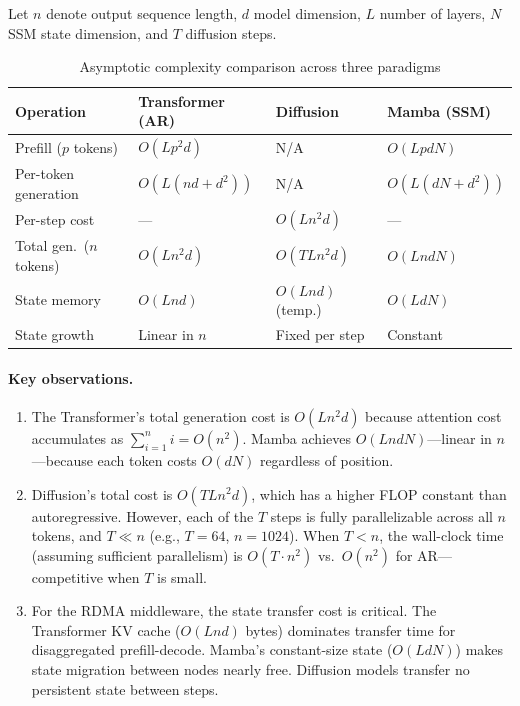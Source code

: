 \documentclass[11pt,letterpaper]{article}
\begin{document}
Let $n$ denote output sequence length, $d$ model dimension, $L$ number of layers, $N$ SSM state dimension, and $T$ diffusion steps.

\begin{table}[htbp]
\centering
\caption{Asymptotic complexity comparison across three paradigms}
\label{tab:complexity}
\begin{tabular}{@{}llll@{}}
\toprule
\textbf{Operation} & \textbf{Transformer (AR)} & \textbf{Diffusion} & \textbf{Mamba (SSM)} \\
\midrule
Prefill ($p$ tokens) & $O(Lp^2d)$ & N/A & $O(LpdN)$ \\
Per-token generation & $O(L(nd + d^2))$ & N/A & $O(L(dN + d^2))$ \\
Per-step cost & --- & $O(Ln^2d)$ & --- \\
Total gen.\ ($n$ tokens) & $O(Ln^2d)$ & $O(TLn^2d)$ & $O(LndN)$ \\
State memory & $O(Lnd)$ & $O(Lnd)$ (temp.) & $O(LdN)$ \\
State growth & Linear in $n$ & Fixed per step & Constant \\
\bottomrule
\end{tabular}
\end{table}

\paragraph{Key observations.}
\begin{enumerate}[noitemsep]
    \item The Transformer's total generation cost is $O(Ln^2d)$ because attention cost accumulates as $\sum_{i=1}^{n} i = O(n^2)$. Mamba achieves $O(LndN)$---linear in $n$---because each token costs $O(dN)$ regardless of position.

    \item Diffusion's total cost is $O(TLn^2d)$, which has a higher FLOP constant than autoregressive. However, each of the $T$ steps is fully parallelizable across all $n$ tokens, and $T \ll n$ (e.g., $T=64$, $n=1024$). When $T < n$, the wall-clock time (assuming sufficient parallelism) is $O(T \cdot n^2)$ vs.\ $O(n^2)$ for AR---competitive when $T$ is small.

    \item For the RDMA middleware, the state transfer cost is critical. The Transformer KV cache ($O(Lnd)$ bytes) dominates transfer time for disaggregated prefill-decode. Mamba's constant-size state ($O(LdN)$) makes state migration between nodes nearly free. Diffusion models transfer no persistent state between steps.
\end{enumerate}
\end{document}
